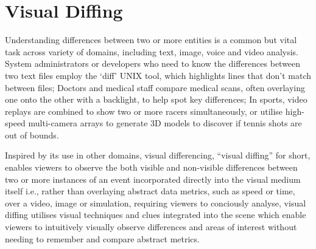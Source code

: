 \section{Visual Diffing}
\label{sec:visualDiffing}
Understanding differences between two or more entities is a common but vital task across variety of domains, including text, image, voice and video analysis. System administrators or developers who need to know the differences between two text files employ the `diff' UNIX tool\footnotemark, which highlights lines that don't match between files; Doctors and medical staff compare medical scans, often overlaying one onto the other with a backlight, to help spot key differences; In sports, video replays are combined to show two or more racers simultaneously, or utilise high-speed multi-camera arrays to generate 3D models to discover if tennis shots are out of bounds.

Inspired by its use in other domains, visual differencing, ``visual diffing'' for short, enables viewers to observe the both visible and non-visible differences between two or more instances of an event incorporated directly into the visual medium itself i.e., rather than overlaying abstract data metrics, such as speed or time, over a video, image or simulation, requiring viewers to conciously analyse, visual diffing utilises visual techniques and clues integrated into the scene which enable viewers to intuitively visually observe differences and areas of interest without needing to remember and compare abstract metrics.  


